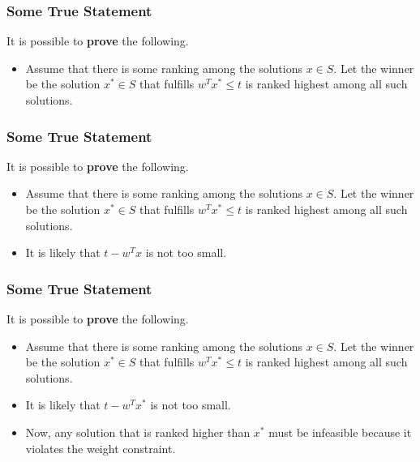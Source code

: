 \begin{frame}
    \frametitle{Some True Statement}

    It is possible to \textbf{prove} the following.

    \begin{itemize}
        \item Assume that there is some ranking among the solutions $x \in S$. Let the winner
              be the solution $x^{*} \in S$ that fulfills $w^T x^{*} \leq t$ is ranked
              highest among all such solutions.
    \end{itemize}

\end{frame}

\begin{frame}
    \frametitle{Some True Statement}

    It is possible to \textbf{prove} the following.

    \begin{itemize}
        \item Assume that there is some ranking among the solutions $x \in S$. Let the winner
              be the solution $x^{*} \in S$ that fulfills $w^T x^{*} \leq t$ is ranked
              highest among all such solutions.
        \item It is likely that $t - w^T x$ is not too small.
    \end{itemize}

\end{frame}

\begin{frame}
    \frametitle{Some True Statement}

    It is possible to \textbf{prove} the following.

    \begin{itemize}
        \item Assume that there is some ranking among the solutions $x \in S$. Let the winner
              be the solution $x^{*} \in S$ that fulfills $w^T x^{*} \leq t$ is ranked
              highest among all such solutions.
        \item It is likely that $t - w^T x^{*}$ is not too small.
        \item Now, any solution that is ranked higher than $x^{*}$ must be infeasible because
              it violates the weight constraint.
    \end{itemize}

\end{frame}


